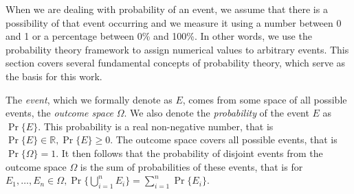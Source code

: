 
\renewcommand{\Pr}[1]{\operatorname{Pr}\{#1\}}

When we are dealing with probability of an event, we assume that there is a possibility
of that event occurring and we measure it using a number between 0 and 1 or a percentage
between 0\% and 100\%. In other words, we use the probability theory framework to assign
numerical values to arbitrary events. This section covers several fundamental concepts of
probability theory, which serve as the basis for this work.

The \textit{event}, which we formally denote as $E$, comes from some space of all possible
events, the \textit{outcome space} $\Omega$. We also denote the \textit{probability} of the
event $E$ as $\Pr{E}$. This probability is a real non-negative number,
that is $\Pr{E} \in \mathbb{R}, \Pr{E} \geq 0$. The outcome
space covers all possible events, that is $\Pr{\Omega} = 1$. It then follows
that the probability of disjoint events from the outcome space $\Omega$ is the sum of
probabilities of these events, that is for
$E_1, \ldots, E_n \in \Omega, \Pr{\bigcup_{i=1}^n E_i} = \sum_{i=1}^n \Pr{E_i}$.

